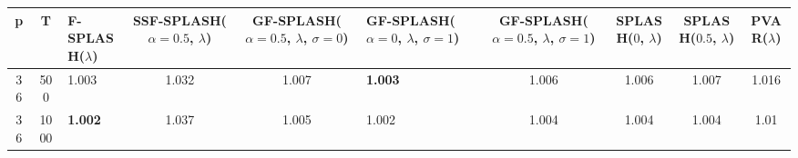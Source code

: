 \begin{tabular}{cclcclcccc}
\hline
  p  &  T   & F-SPLASH($\lambda$)   &  SSF-SPLASH($\alpha=0.5$, $\lambda$)  &  GF-SPLASH($\alpha=0.5$, $\lambda$, $\sigma=0$)  & GF-SPLASH($\alpha=0$, $\lambda$, $\sigma=1$)   &  GF-SPLASH($\alpha=0.5$, $\lambda$, $\sigma=1$)  &  SPLASH($0$, $\lambda$)  &  SPLASH($0.5$, $\lambda$)  &  PVAR($\lambda$)  \\
\hline
 36  & 500  & 1.003                 &                 1.032                 &                      1.007                       & \textbf{1.003}                                 &                      1.006                       &          1.006           &           1.007            &       1.016       \\
 36  & 1000 & \textbf{1.002}        &                 1.037                 &                      1.005                       & 1.002                                          &                      1.004                       &          1.004           &           1.004            &       1.01        \\
\hline
\end{tabular}